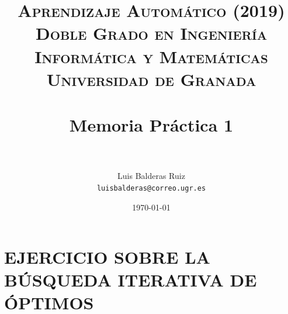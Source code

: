 
\graphicspath{ {./images/} }
\usepackage{subcaption}
\usepackage{hyperref}
\usepackage{soul}



\title{	
\normalfont \normalsize 
\textsc{\textbf{Aprendizaje Automático (2019)} \\ Doble Grado en Ingeniería Informática y Matemáticas \\ Universidad de Granada} \\ [25pt] %
\horrule{0.5pt} \\[0.4cm] %
\huge Memoria Práctica 1 \\ %
\horrule{2pt} \\[0.5cm] %
}

\author{Luis Balderas Ruiz \\ \texttt{luisbalderas@correo.ugr.es}} 


\date{\normalsize\today} %




\maketitle %

\newpage %

\tableofcontents %

\listoffigures

\listoftables

\newpage



\section{EJERCICIO SOBRE LA BÚSQUEDA ITERATIVA DE ÓPTIMOS}

